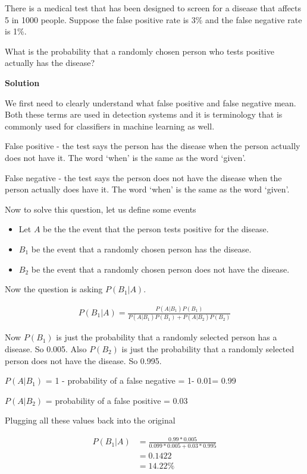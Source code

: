 \documentclass[12pt]{article}
\begin{document}
\medskip

There is a medical test that has been designed to screen for a disease that affects 5 in 1000 people. Suppose the false positive rate is 3\% and the false negative rate is 1\%. 

What is the probability that a randomly chosen person who tests positive actually has the disease?

\textbf{Solution}

We first need to clearly understand what false positive and false negative mean. Both these terms are used in detection systems and it is terminology that is commonly used for classifiers in machine learning as well.

False positive - the test says the person has the disease when the person actually does not have it. The word `when' is the same as the word `given'.

False negative - the test says the person does not have the disease when the person actually does have it. The word `when' is the same as the word `given'.

Now to solve this question, let us define some events

\begin{itemize}
\item Let $A$ be the the event that the person tests positive for the disease.
\item $B_1$ be the event that a randomly chosen person has the disease.
\item $B_2$ be the event that a randomly chosen person does not have the disease.
\end{itemize}

Now the question is asking $P(B_1|A)$.

\begin{align*}
P(B_1|A) = \frac{P(A|B_1)P(B_1)}{P(A|B_1)P(B_1) + P(A|B_2)P(B_2)}
\end{align*}

Now $P(B_1)$ is  just the probability that a randomly selected person has a disease. So 0.005.
Also $P(B_2)$ is just the probability that a randomly selected person does not have the disease. So 0.995.

$P(A|B_1)$ = 1 - probability of a false negative = 1- 0.01= 0.99

$P(A|B_2)$ = probability of a false positive = 0.03

Plugging all these values back into the original 

\begin{align*}
P(B_1|A) &= \frac{0.99*0.005}{0.099*0.005 + 0.03 * 0.995} \\
&= 0.1422 \\
&= 14.22\%
\end{align*} 
\end{document}
